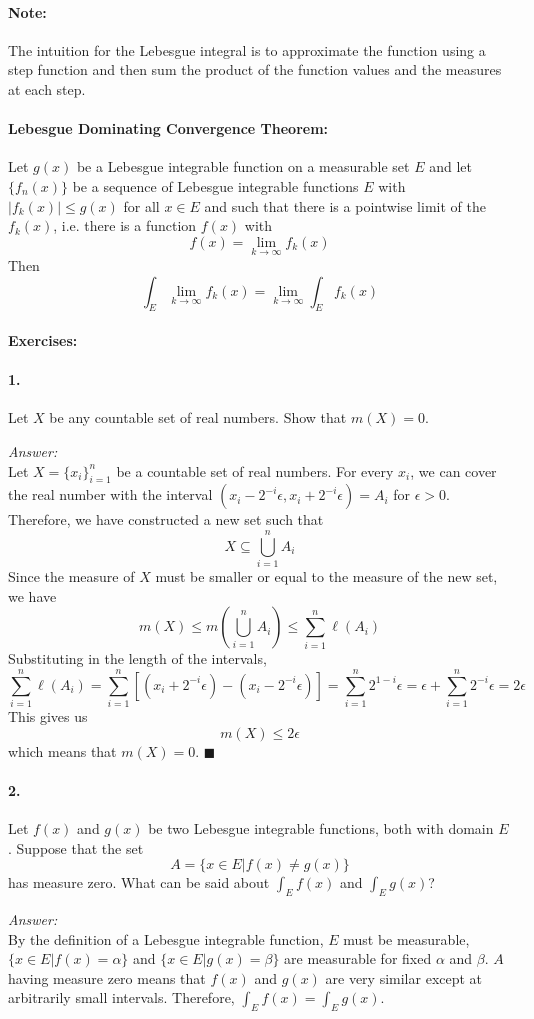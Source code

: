 \documentclass[10pt,a4paper]{article}
\begin{document}
\paragraph{Note:} The intuition for the Lebesgue integral is to approximate the function using a step function and then sum the product of the function values and the measures at each step.

\paragraph{Lebesgue Dominating Convergence Theorem:}  Let $g(x)$ be a Lebesgue integrable function on a measurable set $E$ and let $\{f_n(x)\}$ be a sequence of Lebesgue integrable functions $E$ with $|f_k(x)| \leq g(x)$ for all $x \in E$ and such that there is a pointwise limit of the $f_k(x)$, i.e. there is a function $f(x)$ with
$$ f(x) = \lim_{k \to \infty} f_k(x)$$
Then 
$$ \int_E \lim_{k \to \infty} f_k(x) = \lim_{k \to \infty} \int_E f_k(x)$$

\paragraph{Exercises:}
\paragraph{1.} Let $X$ be any countable set of real numbers. Show that $m(X)=0$.
\begin{flushleft}
\textit{Answer:}\\
Let $X = \{x_i \}_{i=1}^n$ be a countable set of real numbers. For every $x_i$, we can cover the real number with the interval $(x_i-2^{-i}\epsilon, x_i+2^{-i}\epsilon) = A_i$ for $\epsilon > 0$. Therefore, we have constructed a new set such that
$$ X \subseteq \bigcup_{i=1}^n A_i$$
Since the measure of $X$ must be smaller or equal to the measure of the new set, we have
$$ m(X) \leq m\left(\bigcup_{i=1}^n A_i\right) \leq \sum_{i=1}^n \ell(A_i)$$
Substituting in the length of the intervals,
$$ \sum_{i=1}^n \ell(A_i) = \sum_{i=1}^n \left[(x_i+2^{-i}\epsilon)-(x_i-2^{-i}\epsilon)\right] = \sum_{i=1}^n 2^{1-i}\epsilon = \epsilon + \sum_{i=1}^n 2^{-i}\epsilon = 2\epsilon$$
This gives us
$$ m(X) \leq 2\epsilon$$
which means that $m(X) =0$. $\blacksquare$
\end{flushleft}

\paragraph{2.} Let $f(x)$ and $g(x)$ be two Lebesgue integrable functions, both with domain $E$. Suppose that the set
$$ A = \{x \in E | f(x) \neq g(x) \}$$
has measure zero. What can be said about $\int_Ef(x)$ and $\int_Eg(x)$?
\begin{flushleft}
\textit{Answer:}\\
By the definition of a Lebesgue integrable function, $E$ must be measurable, $\{x \in E|f(x) = \alpha \}$ and $\{x \in E|g(x) = \beta\}$ are measurable for fixed $\alpha$ and $\beta$. $A$ having measure zero means that $f(x)$ and $g(x)$ are very similar except at arbitrarily small intervals. Therefore, $\int_Ef(x)=\int_Eg(x)$.
\end{flushleft}
\end{document}

